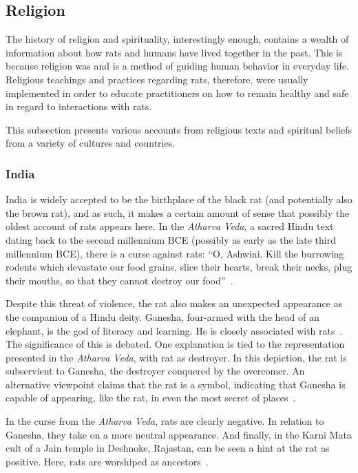 \documentclass[12pt]{article}
\begin{document}
\subsection{Religion} \label{Religion}

The history of religion and spirituality, interestingly enough, contains a wealth of information about how rats and humans have lived together in the past. This is because religion was and is a method of guiding human behavior in everyday life. Religious teachings and practices regarding rats, therefore, were usually implemented in order to educate practitioners on how to remain healthy and safe in regard to interactions with rats.

This subsection presents various accounts from religious texts and spiritual beliefs from a variety of cultures and countries.

\subsubsection{India} \label{India}

India is widely accepted to be the birthplace of the black rat (and potentially also the brown rat), and as such, it makes a certain amount of sense that possibly the oldest account of rats appears here. In the \textit{Atharva Veda}, a sacred Hindu text dating back to the second millennium BCE (possibly as early as the late third millennium BCE), there is a curse against rats: ``O, Ashwini. Kill the burrowing rodents which devastate our food grains, slice their hearts, break their necks, plug their mouths, so that they cannot destroy our food''~\cite{Barnett2001}.

Despite this threat of violence, the rat also makes an unexpected appearance as the companion of a Hindu deity. Ganesha, four-armed with the head of an elephant, is the god of literacy and learning. He is closely associated with rats~\cite{Barnett2001}. The significance of this is debated. One explanation is tied to the representation presented in the \textit{Atharva Veda}, with rat as destroyer. In this depiction, the rat is subservient to Ganesha, the destroyer conquered by the overcomer. An alternative viewpoint claims that the rat is a symbol, indicating that Ganesha is capable of appearing, like the rat, in even the most secret of places~\cite{Barnett2001}.

In the curse from the \textit{Atharva Veda}, rats are clearly negative. In relation to Ganesha, they take on a more neutral appearance. And finally, in the Karni Mata cult of a Jain temple in Deshnoke, Rajastan, can be seen a hint at the rat as positive. Here, rats are worshiped as ancestors~\cite{Edelman2005}.
\end{document}
